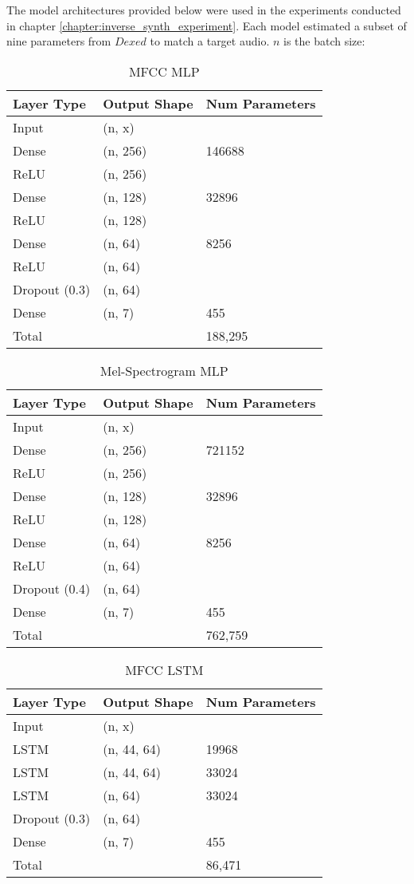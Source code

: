 \label{appendix:spiegelib_models}

The model architectures provided below were used in the experiments conducted in chapter \ref{chapter:inverse_synth_experiment}. Each model estimated a subset of nine parameters from $Dexed$ to match a target audio. $n$ is the batch size:

\begin{table}[h]
\caption{MFCC MLP}
\centering
\begin{tabular}{l|l|l}
Layer Type & Output Shape & Num Parameters \\ \hline
Input & (n, x) & \\
Dense & (n, 256) & 146688\\
ReLU    & (n, 256) &\\
Dense & (n, 128) & 32896\\
ReLU    & (n, 128) &  \\
Dense & (n, 64) & 8256 \\
ReLU    & (n, 64) & \\
Dropout (0.3) & (n, 64) & \\
Dense   & (n, 7) & 455\\
\hline
\hline
Total   & \ & 188,295\\
\end{tabular}
\end{table}

\begin{table}[h]
\caption{Mel-Spectrogram MLP}
\centering
\begin{tabular}{l|l|l}
Layer Type & Output Shape & Num Parameters \\ \hline
Input & (n, x) & \\
Dense & (n, 256) & 721152\\
ReLU    & (n, 256) &\\
Dense & (n, 128) & 32896\\
ReLU    & (n, 128) &  \\
Dense & (n, 64) & 8256 \\
ReLU    & (n, 64) & \\
Dropout (0.4) & (n, 64) & \\
Dense   & (n, 7) & 455\\
\hline
\hline
Total   & \ & 762,759\\
\end{tabular}
\end{table}

\begin{table}[h]
\caption{MFCC LSTM}
\centering
\begin{tabular}{l|l|l}
Layer Type & Output Shape & Num Parameters \\ \hline
Input & (n, x) & \\
LSTM & (n, 44, 64) & 19968\\
LSTM & (n, 44, 64) & 33024\\
LSTM & (n, 64) & 33024\\
Dropout (0.3) & (n, 64) & \\
Dense   & (n, 7) & 455\\
\hline
\hline
Total   & \ & 86,471\\
\end{tabular}
\end{table}

